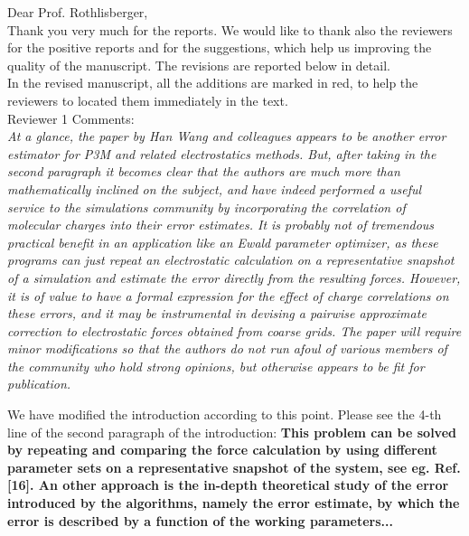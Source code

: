\documentclass[a4paper]{article}
\begin{document}
\noindent
Dear Prof. Rothlisberger,\\

Thank you very much for the reports. We would like to thank also the
reviewers for the positive reports and for the suggestions, which help
us improving the quality of the manuscript. The revisions are
reported below in detail.\\

In the revised manuscript, all the additions are marked in red, to help the
reviewers to located them immediately in the text.\\

\noindent
Reviewer  1 Comments:\\

\textit{ At a glance, the paper by Han Wang and colleagues appears to
  be another error estimator for P3M and related electrostatics
  methods.  But, after taking in the second paragraph it becomes clear
  that the authors are much more than mathematically inclined on the
  subject, and have indeed performed a useful service to the
  simulations community by incorporating the correlation of molecular
  charges into their error estimates.  It is probably not of
  tremendous practical benefit in an application like an Ewald
  parameter optimizer, as these programs can just repeat an
  electrostatic calculation on a representative snapshot of a
  simulation and estimate the error directly from the resulting
  forces.  However, it is of value to have a formal expression for the
  effect of charge correlations on these errors, and it may be
  instrumental in devising a pairwise approximate correction to
  electrostatic forces obtained from coarse grids.  The paper will
  require minor modifications so that the authors do not run afoul of
  various members of the community who hold strong opinions, but
  otherwise appears to be fit for publication.
}

We have modified the introduction according to this point.
Please see the 4-th line of the second paragraph of the introduction:
\textbf{
  This problem can be solved by repeating and comparing
  the force calculation by
  using different parameter sets
  on a representative snapshot of the system,
  see eg. Ref.[16].
An other approach is the 
  in-depth theoretical study
of the error introduced by the algorithms, namely the
error estimate,
by which the error is described by a function of the working
parameters...
}\\
\end{document}
